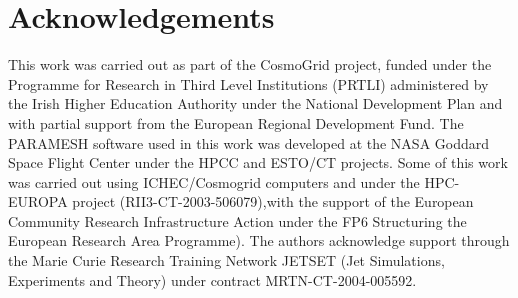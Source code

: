 \documentclass{aa}
\begin{document}
\section*{Acknowledgements}
This work was carried out as part of the CosmoGrid project, funded under the Programme for Research in Third Level Institutions (PRTLI) administered by the Irish Higher Education Authority under the National Development Plan and with partial support from the European Regional Development Fund. The PARAMESH software used in this work was developed at the NASA Goddard Space Flight Center under the HPCC and ESTO/CT projects. Some of this work was carried out using ICHEC/Cosmogrid computers and under the HPC-EUROPA project (RII3-CT-2003-506079),with the support of the European Community Research Infrastructure Action under the FP6 Structuring the European Research Area Programme).
The authors acknowledge support
through the Marie Curie Research Training Network JETSET (Jet Simulations,
Experiments and Theory) under contract MRTN-CT-2004-005592.


\end{document}
